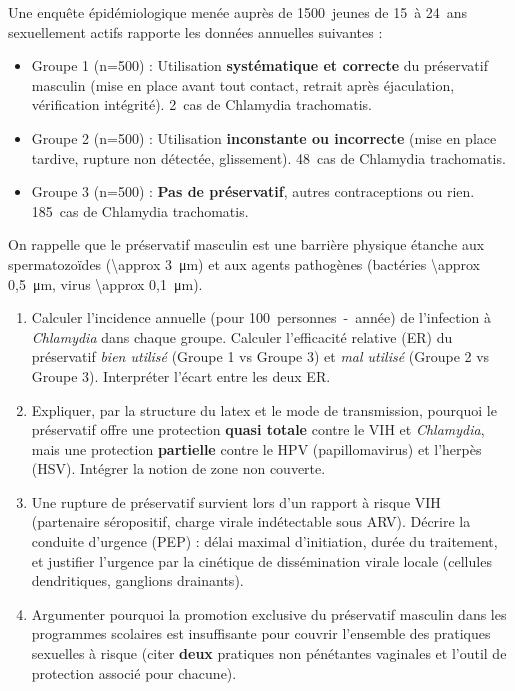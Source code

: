 \documentclass[11pt]{article}
\begin{document}
\begin{exercice}
Une enquête épidémiologique menée auprès de \SI{1500}{jeunes} de \SI{15}{à} \SI{24}{ans} sexuellement actifs rapporte les données annuelles suivantes :
\begin{itemize}
    \item Groupe 1 (n=\SI{500}{}) : Utilisation \textbf{systématique et correcte} du préservatif masculin (mise en place avant tout contact, retrait après éjaculation, vérification intégrité). \SI{2}{cas} de Chlamydia trachomatis.
    \item Groupe 2 (n=\SI{500}{}) : Utilisation \textbf{inconstante ou incorrecte} (mise en place tardive, rupture non détectée, glissement). \SI{48}{cas} de Chlamydia trachomatis.
    \item Groupe 3 (n=\SI{500}{}) : \textbf{Pas de préservatif}, autres contraceptions ou rien. \SI{185}{cas} de Chlamydia trachomatis.
\end{itemize}
On rappelle que le préservatif masculin est une barrière physique étanche aux spermatozoïdes (\SI{\approx 3}{\micro\meter}) et aux agents pathogènes (bactéries \SI{\approx 0,5}{\micro\meter}, virus \SI{\approx 0,1}{\micro\meter}).

\begin{enumerate}
    \item Calculer l'incidence annuelle (pour \SI{100}{personnes-année}) de l'infection à \textit{Chlamydia} dans chaque groupe. Calculer l'efficacité relative (ER) du préservatif \textit{bien utilisé} (Groupe 1 vs Groupe 3) et \textit{mal utilisé} (Groupe 2 vs Groupe 3). Interpréter l'écart entre les deux ER.
    \item Expliquer, par la structure du latex et le mode de transmission, pourquoi le préservatif offre une protection \textbf{quasi totale} contre le VIH et \textit{Chlamydia}, mais une protection \textbf{partielle} contre le HPV (papillomavirus) et l'herpès (HSV). Intégrer la notion de zone non couverte.
    \item Une rupture de préservatif survient lors d'un rapport à risque VIH (partenaire séropositif, charge virale indétectable sous ARV). Décrire la conduite d'urgence (PEP) : délai maximal d'initiation, durée du traitement, et justifier l'urgence par la cinétique de dissémination virale locale (cellules dendritiques, ganglions drainants).
    \item Argumenter pourquoi la promotion exclusive du préservatif masculin dans les programmes scolaires est insuffisante pour couvrir l'ensemble des pratiques sexuelles à risque (citer \textbf{deux} pratiques non pénétantes vaginales et l'outil de protection associé pour chacune).
\end{enumerate}
\end{exercice}
\end{document}
